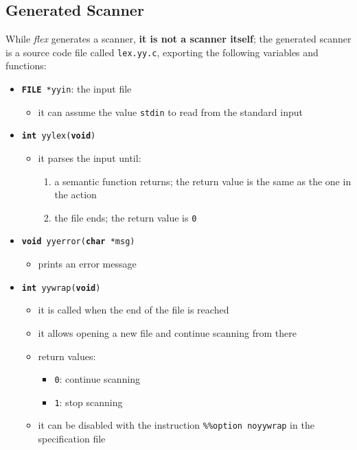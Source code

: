 \subsection{Generated Scanner}
While \textit{flex} generates a scanner, \textbf{it is not a scanner itself};
the generated scanner is a \clang source code file called \texttt{lex.yy.c}, exporting the following variables and functions:
\begin{itemize}[label=\textbf{\texttt{>}}]
  \item \texttt{\textbf{FILE} *yyin}: the input file
        \begin{itemize}
          \item it can assume the value \texttt{stdin} to read from the standard input
        \end{itemize}
  \item \texttt{\textbf{int} yylex(\textbf{void})}
        \begin{itemize}
          \item it parses the input until:
                \begin{enumerate}
                  \item a semantic function returns; the return value is the same as the one in the action
                  \item the file ends; the return value is \texttt{0}
                \end{enumerate}
        \end{itemize}
  \item \texttt{\textbf{void} yyerror(\textbf{char} *msg)}
        \begin{itemize}
          \item prints an error message
        \end{itemize}
  \item \texttt{\textbf{int} yywrap(\textbf{void})}
        \begin{itemize}
          \item it is called when the end of the file is reached
          \item it allows opening a new file and continue scanning from there
          \item return values:
                \begin{itemize}
                  \item \texttt{0}: continue scanning
                  \item \texttt{1}: stop scanning
                \end{itemize}
          \item it can be disabled with the instruction \texttt{\%\%option noyywrap} in the specification file
        \end{itemize}
\end{itemize}

